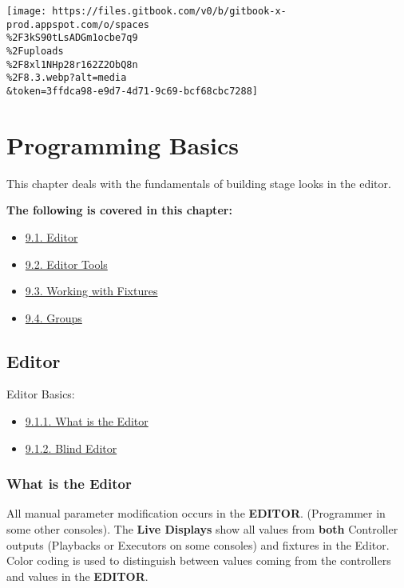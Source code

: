 \documentclass[
]{article}
\providecommand{\tightlist}{%
  \setlength{\itemsep}{0pt}\setlength{\parskip}{0pt}}
\begin{document}
\texttt{[image: https://files.gitbook.com/v0/b/gitbook-x-prod.appspot.com/o/spaces\\\%2F3kS90tLsADGm1ocbe7q9\\\%2Fuploads\\\%2F8xl1NHp28r162Z2ObQ8n\\\%2F8.3.webp?alt=media\\\&token=3ffdca98-e9d7-4d71-9c69-bcf68cbc7288]}

\hypertarget{programming-basics}{%
\section{Programming Basics}\label{programming-basics}}

This chapter deals with the fundamentals of building stage looks in the editor.

\textbf{The following is covered in this chapter:}

\begin{itemize}
\tightlist
\item
  \href{https://vibemanual.compulite.com/programming-basics.html\#editor}{9.1. Editor}
\item
  \href{https://vibemanual.compulite.com/programming-basics.html\#editor-tools}{9.2. Editor Tools}
\item
  \href{https://vibemanual.compulite.com/programming-basics.html\#working-with-fixtures}{9.3. Working with Fixtures}
\item
  \href{https://vibemanual.compulite.com/programming-basics.html\#groups}{9.4. Groups}
\end{itemize}

\hypertarget{editor}{%
\subsection{Editor}\label{editor}}

Editor Basics:

\begin{itemize}
\tightlist
\item
  \href{https://vibemanual.compulite.com/programming-basics.html\#what-is-the-editor}{9.1.1. What is the Editor}
\item
  \href{https://vibemanual.compulite.com/programming-basics.html\#blind-editor}{9.1.2. Blind Editor}
\end{itemize}

\hypertarget{what-is-the-editor}{%
\subsubsection{What is the Editor}\label{what-is-the-editor}}

All manual parameter modification occurs in the \textbf{EDITOR}. (Programmer in some other consoles). The \textbf{Live Displays} show all values from \textbf{both} Controller outputs (Playbacks or Executors on some consoles) and fixtures in the Editor. Color coding is used to distinguish between values coming from the controllers and values in the \textbf{EDITOR}.
\end{document}
